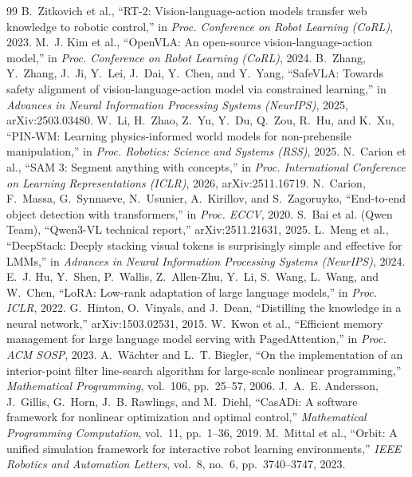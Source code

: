 \documentclass[10pt,a4paper]{article}
\begin{document}
\begin{thebibliography}{99}
 B.~Zitkovich et al., ``RT-2: Vision-language-action models transfer web knowledge to robotic control,'' in \emph{Proc. Conference on Robot Learning (CoRL)}, 2023.
 M.~J. Kim et al., ``OpenVLA: An open-source vision-language-action model,'' in \emph{Proc. Conference on Robot Learning (CoRL)}, 2024.
 B.~Zhang, Y.~Zhang, J.~Ji, Y.~Lei, J.~Dai, Y.~Chen, and Y.~Yang, ``SafeVLA: Towards safety alignment of vision-language-action model via constrained learning,'' in \emph{Advances in Neural Information Processing Systems (NeurIPS)}, 2025, arXiv:2503.03480.
 W.~Li, H.~Zhao, Z.~Yu, Y.~Du, Q.~Zou, R.~Hu, and K.~Xu, ``PIN-WM: Learning physics-informed world models for non-prehensile manipulation,'' in \emph{Proc. Robotics: Science and Systems (RSS)}, 2025.
 N.~Carion et al., ``SAM 3: Segment anything with concepts,'' in \emph{Proc. International Conference on Learning Representations (ICLR)}, 2026, arXiv:2511.16719.
 N.~Carion, F.~Massa, G.~Synnaeve, N.~Usunier, A.~Kirillov, and S.~Zagoruyko, ``End-to-end object detection with transformers,'' in \emph{Proc. ECCV}, 2020.
 S.~Bai et al. (Qwen Team), ``Qwen3-VL technical report,'' arXiv:2511.21631, 2025.
 L.~Meng et al., ``DeepStack: Deeply stacking visual tokens is surprisingly simple and effective for LMMs,'' in \emph{Advances in Neural Information Processing Systems (NeurIPS)}, 2024.
 E.~J. Hu, Y.~Shen, P.~Wallis, Z.~Allen-Zhu, Y.~Li, S.~Wang, L.~Wang, and W.~Chen, ``LoRA: Low-rank adaptation of large language models,'' in \emph{Proc. ICLR}, 2022.
 G.~Hinton, O.~Vinyals, and J.~Dean, ``Distilling the knowledge in a neural network,'' arXiv:1503.02531, 2015.
 W.~Kwon et al., ``Efficient memory management for large language model serving with PagedAttention,'' in \emph{Proc. ACM SOSP}, 2023.
 A.~W\"achter and L.~T. Biegler, ``On the implementation of an interior-point filter line-search algorithm for large-scale nonlinear programming,'' \emph{Mathematical Programming}, vol.~106, pp.~25--57, 2006.
 J.~A.~E. Andersson, J.~Gillis, G.~Horn, J.~B. Rawlings, and M.~Diehl, ``CasADi: A software framework for nonlinear optimization and optimal control,'' \emph{Mathematical Programming Computation}, vol.~11, pp.~1--36, 2019.
 M.~Mittal et al., ``Orbit: A unified simulation framework for interactive robot learning environments,'' \emph{IEEE Robotics and Automation Letters}, vol.~8, no.~6, pp.~3740--3747, 2023.
\end{thebibliography}
\end{document}
